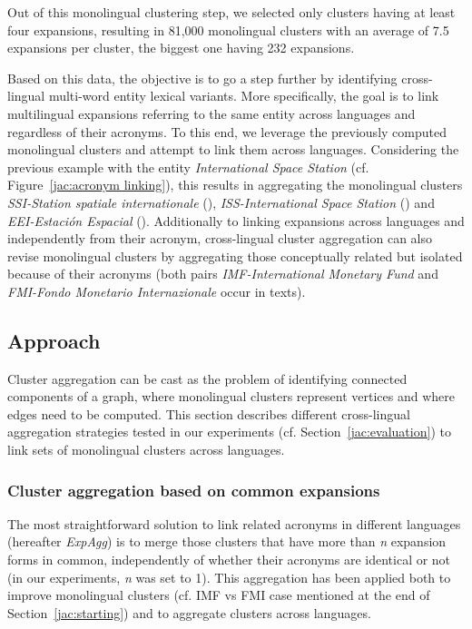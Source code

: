 \documentclass[output=paper]{langsci/langscibook}
\begin{document}
Out of this monolingual clustering step, we selected only clusters
having at least four expansions, resulting in 81,000 monolingual
clusters with an average of 7.5 expansions per cluster, the biggest
one having 232 expansions.

Based on this data, the objective is to go a step further by
identifying cross-lingual multi-word entity lexical variants. More
specifically, the goal is to link multilingual expansions referring to
the same entity across languages and regardless of their acronyms.  To
this end, we leverage the previously computed monolingual clusters and
attempt to link them across languages. Considering the previous
example with the entity \textit{International Space Station}
(cf. Figure~\ref{jac:acronym linking}), this results in aggregating the
monolingual clusters \textit{SSI-Station spatiale internationale}
(), \textit{ISS-International Space Station} () and
\textit{EEI-Estaci\'{o}n Espacial} ().  Additionally to linking
expansions across languages and independently from their acronym,
cross-lingual cluster aggregation can also revise monolingual clusters
by aggregating those conceptually related but isolated because of
their acronyms (both pairs \textit{IMF-International Monetary Fund}
and \textit{FMI-Fondo Monetario Internazionale} occur in 
texts).



\subsection{Approach}
\label{jac:approach}

Cluster aggregation can be cast as the problem of identifying
connected components of a graph, where monolingual clusters represent
vertices and where edges need to be computed.  This section describes
different cross-lingual aggregation strategies tested in our
experiments (cf. Section~\ref{jac:evaluation}) to link sets of monolingual
clusters across languages.

\subsubsection{Cluster aggregation based on common expansions}
\label{jac:aggregation clusters based on common expansions}

The most straightforward solution to link related acronyms in
different langua\-ges (hereafter \textit{ExpAgg}) is to merge those
clusters that have more than \textit{n} expansion forms in common,
independently of whether their acronyms are identical or not (in our
experiments, \textit{n} was set to 1). This aggregation has been
applied both to improve monolingual clusters (cf. IMF vs FMI case
mentioned at the end of Section~\ref{jac:starting}) and to aggregate
clusters across languages.
\end{document}
